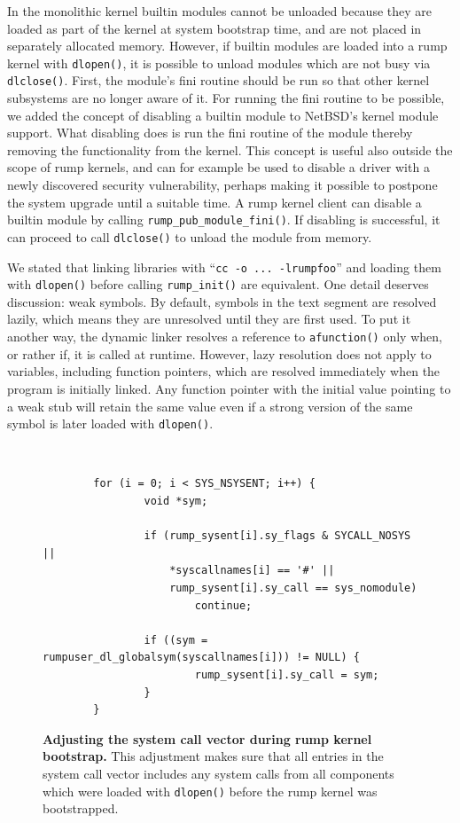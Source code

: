In the monolithic kernel builtin modules cannot be unloaded
because they are loaded as part of the kernel at system bootstrap
time, and are not placed in separately allocated memory.  However, if
builtin modules are loaded into a rump kernel with \texttt{dlopen()},
it is possible to unload modules which are not busy via
\texttt{dlclose()}.  First, the module's fini routine should be
run so that other kernel subsystems are no longer aware of it.  For
running the fini routine
to be possible, we added the concept of disabling a builtin module
to NetBSD's kernel module support.  What disabling does is run the
fini routine of the module thereby removing the functionality from
the kernel.  This concept is useful also outside the scope of rump
kernels, and can for example be used to disable a driver with a
newly discovered security vulnerability, perhaps making it possible
to postpone the system upgrade until a suitable time.  A rump
kernel client can disable a builtin module by calling
\verb+rump_pub_module_fini()+.  If disabling is successful, it can
proceed to call \texttt{dlclose()} to unload the module from memory.

We stated that linking libraries with ``\verb+cc -o ... -lrumpfoo+''
and loading them with \texttt{dlopen()} before calling \verb+rump_init()+
are equivalent.  One detail deserves
discussion: weak symbols.  By default, symbols in the text segment
are resolved lazily, which means they are unresolved until they
are first used.  To put it another way, the dynamic linker resolves a
reference to \verb+afunction()+ only when, or rather if, it is
called at runtime.  However, lazy resolution does not apply to
variables, including function pointers, which are resolved immediately
when the program is initially linked.  Any function
pointer with the initial value pointing to a weak stub will retain
the same value even if a strong version of the same symbol is later
loaded with \texttt{dlopen()}.

\begin{figure}[t]
{\tt \scriptsize  
\begin{verbatim}
        for (i = 0; i < SYS_NSYSENT; i++) {
                void *sym;

                if (rump_sysent[i].sy_flags & SYCALL_NOSYS ||
                    *syscallnames[i] == '#' ||
                    rump_sysent[i].sy_call == sys_nomodule)
                        continue;

                if ((sym = rumpuser_dl_globalsym(syscallnames[i])) != NULL) {
                        rump_sysent[i].sy_call = sym;
                }
        }
\end{verbatim}}
\caption[Adjusting the system call vector during rump kernel bootstrap]{
\textbf{Adjusting the system call vector during rump kernel bootstrap.}
This adjustment makes sure that all entries in the system call vector includes any
system calls from all components which were loaded with \texttt{dlopen()}
before the rump kernel was bootstrapped.
}
\label{fig:weaksysadj}
\end{figure}

